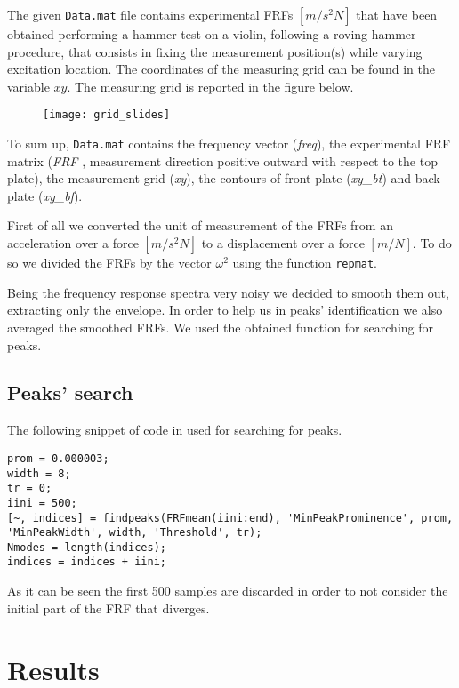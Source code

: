 \documentclass[a4paper,12pt,oneside]{article}
\begin{document}
The given \texttt{Data.mat} file contains experimental FRFs $[m / s^2 N]$ that have been obtained performing a hammer test on a violin, following a roving hammer procedure, that consists in
fixing the measurement position(s) while varying excitation location. 
The coordinates of the measuring grid can be found in the variable $xy$. The measuring grid is reported in the figure below.

\begin{figure}[H]
	\centering
	\texttt{[image: grid\_slides]}
\end{figure}

To sum up, \texttt{Data.mat} contains the frequency vector (\textit{freq}), the experimental FRF matrix (\textit{FRF} , measurement direction positive outward with respect to the top plate), the measurement grid (\textit{xy}), the contours of front plate (\textit{xy\_bt}) and back plate (\textit{xy\_bf}).

First of all we converted the unit of measurement of the FRFs from an acceleration over a force $[m / s^2 N]$ to a displacement over a force $[m / N]$. To do so we divided the FRFs by the vector $\omega^2$ using the function \texttt{repmat}.

Being the frequency response spectra very noisy we decided to smooth them out, extracting only the envelope. 
In order to help us in peaks' identification we also averaged the smoothed FRFs. We used the obtained function for searching for peaks.

\subsection{Peaks' search}\label{peak_search} 
The following snippet of code in used for searching for peaks.

\begin{lstlisting}[caption = {Peaks' search}]
prom = 0.000003;
width = 8;
tr = 0;
iini = 500;
[~, indices] = findpeaks(FRFmean(iini:end), 'MinPeakProminence', prom, 'MinPeakWidth', width, 'Threshold', tr);
Nmodes = length(indices);
indices = indices + iini;
\end{lstlisting}

As it can be seen the first 500 samples are discarded in order to not consider the initial part of the FRF that diverges. 

\section{Results}
\end{document}
